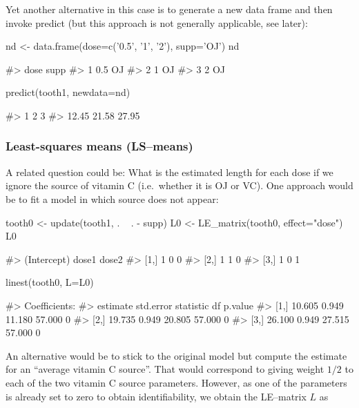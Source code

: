 Yet another alternative in this case is to generate a new data frame and
then invoke predict (but this approach is not generally applicable, see
later):

\begin{Schunk}
\begin{Sinput}
nd <- data.frame(dose=c('0.5', '1', '2'), supp='OJ')
nd
\end{Sinput}
\begin{Soutput}
#>   dose supp
#> 1  0.5   OJ
#> 2    1   OJ
#> 3    2   OJ
\end{Soutput}
\begin{Sinput}
predict(tooth1, newdata=nd)
\end{Sinput}
\begin{Soutput}
#>     1     2     3 
#> 12.45 21.58 27.95
\end{Soutput}
\end{Schunk}

\hypertarget{least-squares-means-lsmeans}{%
\subsubsection{Least-squares means
(LS--means)}\label{least-squares-means-lsmeans}}

A related question could be: What is the estimated length for each dose
if we ignore the source of vitamin C (i.e.~whether it is OJ or VC). One
approach would be to fit a model in which source does not appear:

\begin{Schunk}
\begin{Sinput}
tooth0 <- update(tooth1, . ~ . - supp)
L0 <- LE_matrix(tooth0, effect="dose")
L0
\end{Sinput}
\begin{Soutput}
#>      (Intercept) dose1 dose2
#> [1,]           1     0     0
#> [2,]           1     1     0
#> [3,]           1     0     1
\end{Soutput}
\begin{Sinput}
linest(tooth0, L=L0)
\end{Sinput}
\begin{Soutput}
#> Coefficients:
#>      estimate std.error statistic     df p.value
#> [1,]   10.605     0.949    11.180 57.000       0
#> [2,]   19.735     0.949    20.805 57.000       0
#> [3,]   26.100     0.949    27.515 57.000       0
\end{Soutput}
\end{Schunk}

An alternative would be to stick to the original model but compute the
estimate for an ``average vitamin C source''. That would correspond to
giving weight \(1/2\) to each of the two vitamin C source parameters.
However, as one of the parameters is already set to zero to obtain
identifiability, we obtain the LE--matrix \(L\) as

